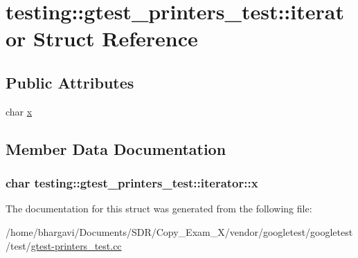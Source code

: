 \hypertarget{structtesting_1_1gtest__printers__test_1_1iterator}{}\section{testing\+:\+:gtest\+\_\+printers\+\_\+test\+:\+:iterator Struct Reference}
\label{structtesting_1_1gtest__printers__test_1_1iterator}
\subsection*{Public Attributes}
\begin{DoxyCompactItemize}
\item 
char \hyperlink{structtesting_1_1gtest__printers__test_1_1iterator_a3d4d056077d3b3869259bdfd60a0778f}{x}
\end{DoxyCompactItemize}


\subsection{Member Data Documentation}
\subsubsection[{\texorpdfstring{x}{x}}]{\setlength{\rightskip}{0pt plus 5cm}char testing\+::gtest\+\_\+printers\+\_\+test\+::iterator\+::x}\hypertarget{structtesting_1_1gtest__printers__test_1_1iterator_a3d4d056077d3b3869259bdfd60a0778f}{}\label{structtesting_1_1gtest__printers__test_1_1iterator_a3d4d056077d3b3869259bdfd60a0778f}


The documentation for this struct was generated from the following file\+:\begin{DoxyCompactItemize}
\item 
/home/bhargavi/\+Documents/\+S\+D\+R/\+Copy\+\_\+\+Exam\+\_\+X/vendor/googletest/googletest/test/\hyperlink{gtest-printers__test_8cc}{gtest-\/printers\+\_\+test.\+cc}\end{DoxyCompactItemize}
